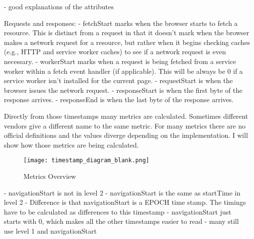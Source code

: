 - good explanations of the attributes



Requests and responses:
- fetchStart marks when the browser starts to fetch a resource. This is distinct from a request in that it doesn't mark when the browser makes a network request for a resource, but rather when it begins checking caches (e.g., HTTP and service worker caches) to see if a network request is even necessary.
- workerStart marks when a request is being fetched from a service worker within a fetch event handler (if applicable). This will be always be 0 if a service worker isn't installed for the current page.
- requestStart is when the browser issues the network request.
- responseStart is when the first byte of the response arrives.
- responseEnd is when the last byte of the response arrives.











Directly from those timestamps many metrics are calculated.
Sometimes different vendors give a different name to the same metric.
For many metrics there are no official definitions and the values diverge depending on the implementation.
I will show how those metrics are being calculated.


\begin{figure}[h!]
\begin{center}
\texttt{[image: timestamp\_diagram\_blank.png]}
\caption{Metrics Overview}
\label{img:latency}
\end{center}
\end{figure}




- navigationStart is not in level 2
- navigationStart is the same as startTime in level 2
- Difference is that navigationStart is a EPOCH time stamp. The timings have to be calculated as differences to this timestamp
- navigationStart just starts with 0, which makes all the other timestamps easier to read
- many still use level 1 and navigationStart


